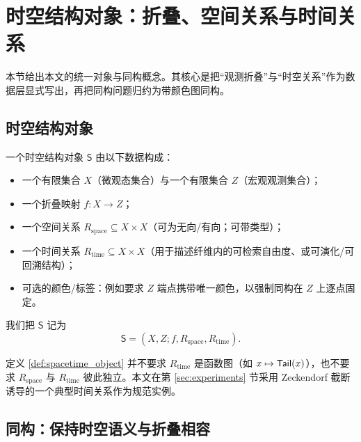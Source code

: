 
\section{时空结构对象：折叠、空间关系与时间关系}

本节给出本文的统一对象与同构概念。其核心是把“观测折叠”与“时空关系”作为数据层显式写出，再把同构问题归约为带颜色图同构。

\subsection{时空结构对象}

\begin{definition}[时空结构对象]\label{def:spacetime_object}
一个时空结构对象 $\mathsf S$ 由以下数据构成：
\begin{itemize}
  \item 一个有限集合 $X$（微观态集合）与一个有限集合 $Z$（宏观观测集合）；
  \item 一个折叠映射 $f:X\to Z$；
  \item 一个空间关系 $R_{\mathrm{space}}\subseteq X\times X$（可为无向/有向；可带类型）；
  \item 一个时间关系 $R_{\mathrm{time}}\subseteq X\times X$（用于描述纤维内的可检索自由度、或可演化/可回溯结构）；
  \item 可选的颜色/标签：例如要求 $Z$ 端点携带唯一颜色，以强制同构在 $Z$ 上逐点固定。
\end{itemize}
我们把 $\mathsf S$ 记为
$$
\mathsf S=(X,Z; f, R_{\mathrm{space}}, R_{\mathrm{time}}).
$$
\end{definition}

\begin{remark}
定义 \ref{def:spacetime_object} 并不要求 $R_{\mathrm{time}}$ 是函数图（如 $x\mapsto \mathsf{Tail}(x)$），也不要求 $R_{\mathrm{space}}$ 与 $R_{\mathrm{time}}$ 彼此独立。本文在第 \ref{sec:experiments} 节采用 Zeckendorf 截断诱导的一个典型时间关系作为规范实例。
\end{remark}

\subsection{同构：保持时空语义与折叠相容}

